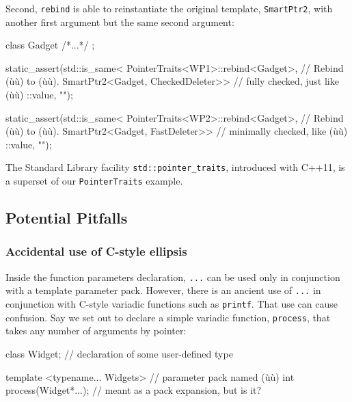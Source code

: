 \noindent Second, \lstinline!rebind! is able to reinstantiate the original template,
\lstinline!SmartPtr2!, with another first argument but the same second
argument:

\begin{emcppslisting}[emcppsbatch=e40]
class Gadget { /*...*/ };

static_assert(std::is_same<
    PointerTraits<WP1>::rebind<Gadget>,  // Rebind (ù{}ù) to (ù{}ù).
    SmartPtr2<Gadget, CheckedDeleter>>   // fully checked, just like (ù{}ù)
::value, "");

static_assert(std::is_same<
    PointerTraits<WP2>::rebind<Gadget>,  // Rebind (ù{}ù) to (ù{}ù).
    SmartPtr2<Gadget, FastDeleter>>      // minimally checked, like (ù{}ù)
::value, "");
\end{emcppslisting}
    

\noindent The Standard Library facility \lstinline!std::pointer_traits!, introduced
with C++11, is a superset of our \lstinline!PointerTraits! example.

\subsection[Potential Pitfalls]{Potential Pitfalls}\label{potential-pitfalls-variadic}

\subsubsection[Accidental use of C-style ellipsis]{Accidental use of C-style ellipsis}\label{accidental-use-of-c-style-ellipsis}

Inside the function parameters declaration, \lstinline!...! can be used
only in conjunction with a template parameter pack. However, there is an
ancient use of \lstinline!...! in conjunction with C-style variadic
functions such as \lstinline!printf!. That use can cause confusion. Say we
set out to declare a simple variadic function, \lstinline!process!, that
takes any number of arguments by pointer:

\begin{emcppslisting}[emcppsbatch=e40]
class Widget;                   // declaration of some user-defined type

template <typename... Widgets>  // parameter pack named (ù{}ù)
int process(Widget*...);        // meant as a pack expansion, but is it?
\end{emcppslisting}
    

